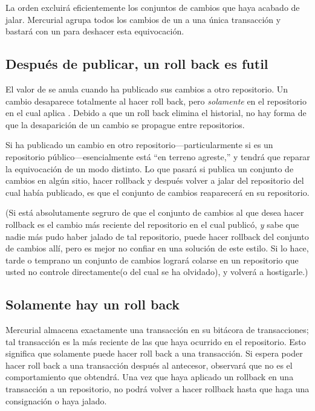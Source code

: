 La orden  excluirá eficientemente los conjuntos de
cambios que haya acabado de jalar.  Mercurial agrupa todos los cambios
de un  a una única transacción y bastará con un
 para deshacer esta equivocación.

\subsection{Después de publicar, un roll back es futil}
\label{sec:undo:rollback-after-push}

El valor de  se anula cuando ha publicado sus cambios
a otro repositorio.  Un cambio desaparece totalmente al hacer roll back,
pero \emph{solamente} en el repositorio en el cual aplica
.  Debido a que un roll back elimina el historial,
no hay forma de que la desaparición de un cambio se propague entre
repositorios.

Si ha publicado un cambio en otro repositorio---particularmente si es
un repositorio público---esencialmente está ``en terreno agreste,''
y tendrá que reparar la equivocación de un modo distinto.  Lo que
pasará si publica un conjunto de cambios en algún sitio, hacer
rollback y después volver a jalar del repositorio del cual había
publicado, es que el conjunto de cambios reaparecerá en su repositorio.

(Si está absolutamente segruro de que el conjunto de cambios al que
desea hacer rollback es el cambio más reciente del repositorio en el
cual publicó, \emph{y} sabe que nadie más pudo haber jalado de tal
repositorio, puede hacer rollback del conjunto de cambios allí, pero
es mejor no confiar en una solución de este estilo.  Si lo hace, tarde
o temprano un conjunto de cambios logrará colarse en un repositorio
que usted no controle directamente(o del cual se ha olvidado), y
volverá a hostigarle.)

\subsection{Solamente hay un roll back}

Mercurial almacena exactamente una transacción en su bitácora de
transacciones; tal transacción es la más reciente de las que haya
ocurrido en el repositorio. Esto significa que solamente puede hacer
roll back a una transacción. Si espera poder hacer roll back a una
transacción después al antecesor, observará que no es el
comportamiento que obtendrá.
Una vez que haya aplicado un rollback en una transacción a un
repositorio, no podrá volver a hacer rollback hasta que haga una
consignación o haya jalado.

